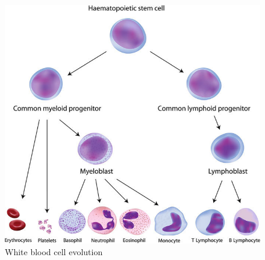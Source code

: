 \documentclass[a4paper,11pt]{article}
\begin{document}
 \begin{figure}[!htbp]
 \begin{center}
  \includegraphics[scale=0.4]{WhiteBloodCell.png} 
  \end{center}
  \caption{White blood cell evolution \citep{phdthesis}}
  \label{fig: stemCells1}
 \end{figure}
\end{document}

